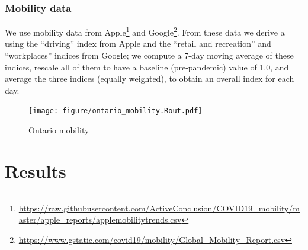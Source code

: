 \documentclass[12pt]{article}\usepackage[]{graphicx}\usepackage[]{color}
\begin{document}
\hypertarget{Mobility data}{}
\subsubsection*{Mobility data}

We use mobility data from Apple\footnote{\url{https://raw.githubusercontent.com/ActiveConclusion/COVID19_mobility/master/apple_reports/applemobilitytrends.csv}} and Google\footnote{\url{https://www.gstatic.com/covid19/mobility/Global_Mobility_Report.csv}}.  From these data we derive a  using the ``driving'' index from Apple and the ``retail and recreation'' and ``workplaces'' indices from Google; we compute a 7-day moving average of these indices, rescale all of them to have a baseline (pre-pandemic) value of 1.0, and average the three indices (equally weighted), to obtain an overall index for each day.


\begin{figure}[ht!]
\texttt{[image: figure/ontario\_mobility.Rout.pdf]}

\caption{Ontario mobility 
}
\label{fig:Ont_mobility}
\end{figure}

\FloatBarrier

\hypertarget{sec:Results}{}
\section{Results}
\end{document}
